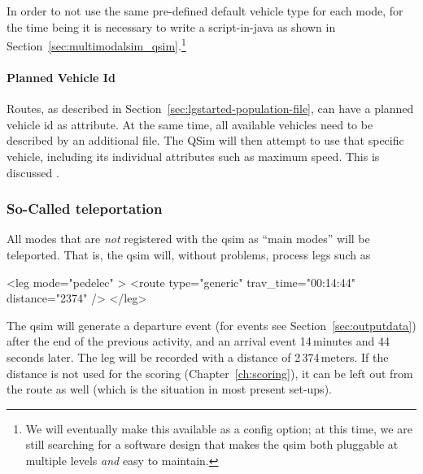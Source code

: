 In order to not use the same pre-defined default vehicle type for each mode, for the time being it is necessary to write a script-in-\gls{java} as shown in Section~\ref{sec:multimodalsim_qsim}.\footnote{We will eventually make this available as a config option; at this time, we are still searching for a software design that makes the \gls{qsim} both pluggable at multiple levels \emph{and} easy to maintain.}


\paragraph{Planned Vehicle Id}
Routes, as described in Section~\ref{sec:lgstarted-population-file}, can have a planned vehicle \gls{id} as attribute.  At the same time, all available vehicles need to be described by an additional file.  The QSim will then attempt to use that specific vehicle, including its individual attributes such as maximum speed.  
This is discussed .



\subsubsection{So-Called \Gls{teleportation}}
All modes that are \emph{not} registered with the \gls{qsim} as ``main modes'' will be teleported.  That is, the \gls{qsim} will, without problems, process legs such as
\begin{xml}
<leg mode="pedelec" >
   <route type="generic" trav_time="00:14:44" distance="2374" />
</leg>
\end{xml}
The \gls{qsim} will generate a departure event (for events see Section~\ref{sec:outputdata}) after the end of the previous activity, and an arrival event 14\,minutes and 44\,seconds later.  The leg will be recorded with a distance of 2\,374\,meters.  If the distance is not used for the scoring (\cf Chapter~\ref{ch:scoring}), it can be left out from the route as well (which is the situation in most present set-ups).

